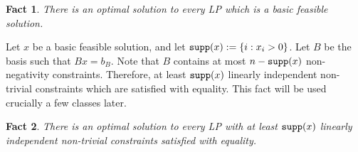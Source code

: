 \documentclass[11pt]{article}
\newtheorem{fact}{Fact}
\def\supp{{\tt supp}}
\begin{document}
\begin{fact}
There is an optimal solution to every LP which is a basic feasible solution.
\end{fact}

Let $x$ be a basic feasible solution, and let $\supp(x) := \{i: x_i > 0\}$. Let $B$ be the basis such that $Bx = b_B$. Note that $B$ contains at most $n - \supp(x)$ non-negativity constraints. Therefore, at least $\supp(x)$
linearly independent non-trivial constraints which are satisfied with equality.
This fact will be used crucially a few classes later. 
\begin{fact}
There is an optimal solution to every LP with at least $\supp(x)$ linearly independent non-trivial constraints 
satisfied with equality.
\end{fact}
%
%
%
%
%
%
\end{document}

